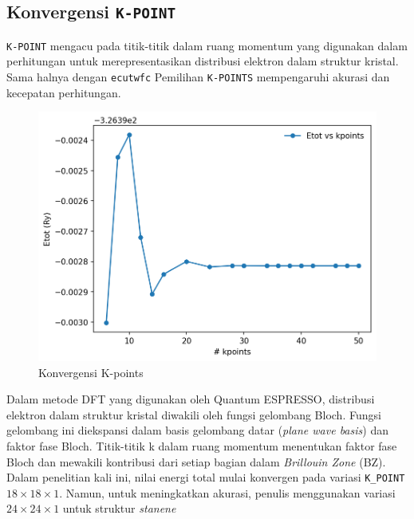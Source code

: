 \subsection{Konvergensi \texttt{K-POINT}}
\texttt{K-POINT} mengacu pada titik-titik dalam ruang momentum yang digunakan dalam perhitungan untuk merepresentasikan distribusi elektron dalam struktur kristal. Sama halnya dengan \texttt{ecutwfc} Pemilihan \texttt{K-POINTS} mempengaruhi akurasi dan kecepatan perhitungan.
\begin{figure}
    \centering
    \includegraphics[width=15cm]{./gambar/plot_kpoints_sn.png}
    \caption{Konvergensi K-points}
    \label{fig:kpoints}
\end{figure}
Dalam metode DFT yang digunakan oleh Quantum ESPRESSO, distribusi elektron dalam struktur kristal diwakili oleh fungsi gelombang Bloch. Fungsi gelombang ini diekspansi dalam basis gelombang datar (\textit{plane wave basis}) dan faktor fase Bloch. Titik-titik k dalam ruang momentum menentukan faktor fase Bloch dan mewakili kontribusi dari setiap bagian dalam \textit{Brillouin Zone} (BZ). Dalam penelitian kali ini, nilai energi total mulai konvergen pada variasi \texttt{K\_POINT} $18\times18\times1$. Namun, untuk meningkatkan akurasi, penulis menggunakan variasi $24\times24\times1$ untuk struktur \textit{stanene}

